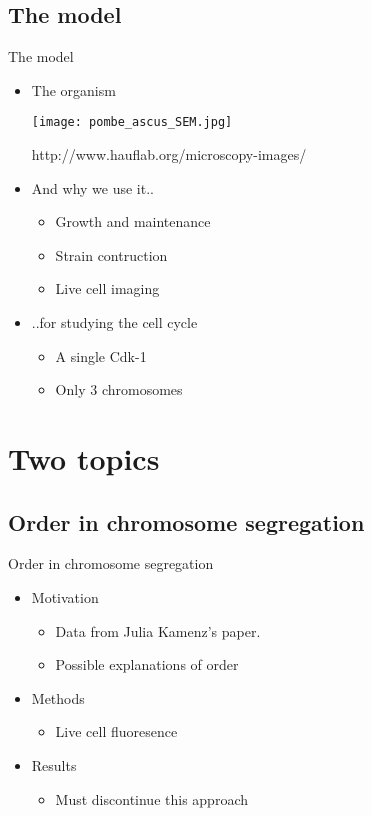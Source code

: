 \subsection{The model}
\begin{frame}{The model}

\begin{itemize}
\item{ The organism
\begin{center}
\texttt{[image: pombe\_ascus\_SEM.jpg]}

\tiny{http://www.hauflab.org/microscopy-images/}
\end{center}}
\item And why we use it..
\begin{itemize}
\item Growth and maintenance
\item Strain contruction
\item Live cell imaging
\end{itemize}
\item ..for studying the cell cycle
\begin{itemize}
\uncover \item A single Cdk-1
\item Only 3 chromosomes
\end{itemize}
\end{itemize}

\end{frame}

\section{Two topics}
\subsection{Order in chromosome segregation}
\begin{frame}{Order in chromosome segregation}
\begin{itemize}
	\item Motivation 
		\begin{itemize}
			\item Data from  Julia Kamenz's paper.
			\item Possible explanations of order
		\end{itemize}
	\item Methods
		\begin{itemize}	
		\item Live cell fluoresence 
		\end{itemize}
	\item Results
		\begin{itemize}
		\item Must discontinue this approach	
		\end{itemize}
\end{itemize}
\end{frame}

